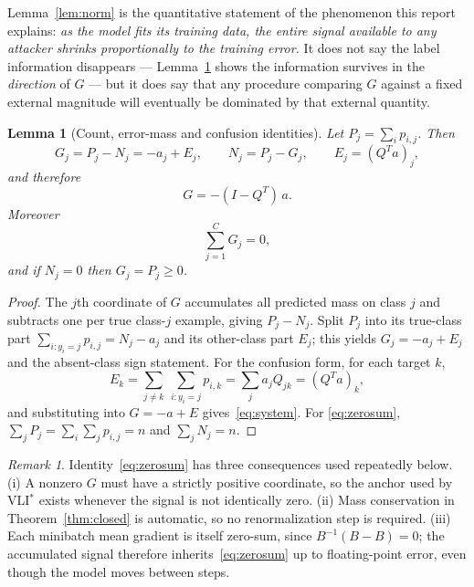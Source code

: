 \documentclass[11pt]{article}
\newtheorem{lemma}{Lemma}
\theoremstyle{remark}
\newtheorem{remark}{Remark}
\begin{document}
Lemma~\ref{lem:norm} is the quantitative statement of the phenomenon this
report explains: \emph{as the model fits its training data, the entire signal
available to any attacker shrinks proportionally to the training error.} It
does not say the label information disappears --- Lemma~\ref{lem:identities}
shows the information survives in the \emph{direction} of $G$ --- but it does
say that any procedure comparing $G$ against a fixed external magnitude will
eventually be dominated by that external quantity.

\begin{lemma}[Count, error-mass and confusion identities]
\label{lem:identities}
Let $P_j = \sum_i p_{i,j}$. Then
\[
 G_j = P_j - N_j = -a_j + E_j,
 \qquad N_j = P_j - G_j,
 \qquad E_j = (Q^Ta)_j ,
\]
and therefore
\begin{equation}
 G = -(I - Q^T)\,a .
 \label{eq:system}
\end{equation}
Moreover
\begin{equation}
 \sum_{j=1}^C G_j = 0 ,
 \label{eq:zerosum}
\end{equation}
and if $N_j = 0$ then $G_j = P_j \ge 0$.
\end{lemma}

\begin{proof}
The $j$th coordinate of $G$ accumulates all predicted mass on class $j$ and
subtracts one per true class-$j$ example, giving $P_j - N_j$. Split $P_j$
into its true-class part $\sum_{i:y_i=j}p_{i,j} = N_j - a_j$ and its
other-class part $E_j$; this yields $G_j = -a_j + E_j$ and the absent-class
sign statement. For the confusion form, for each target $k$,
\[
 E_k = \sum_{j \ne k}\ \sum_{i : y_i = j} p_{i,k}
     = \sum_j a_j Q_{jk} = (Q^Ta)_k ,
\]
and substituting into $G = -a + E$ gives~\eqref{eq:system}. For
\eqref{eq:zerosum}, $\sum_j P_j = \sum_i \sum_j p_{i,j} = n$ and
$\sum_j N_j = n$.
\end{proof}

\begin{remark}
Identity~\eqref{eq:zerosum} has three consequences used repeatedly below.
(i) A nonzero $G$ must have a strictly positive coordinate, so the anchor
used by VLI$^*$ exists whenever the signal is not identically zero.
(ii) Mass conservation in Theorem~\ref{thm:closed} is automatic, so no
renormalization step is required. (iii) Each minibatch mean gradient is
itself zero-sum, since $B^{-1}(B - B) = 0$; the accumulated signal therefore
inherits~\eqref{eq:zerosum} up to floating-point error, even though the model
moves between steps.
\end{remark}
\end{document}

